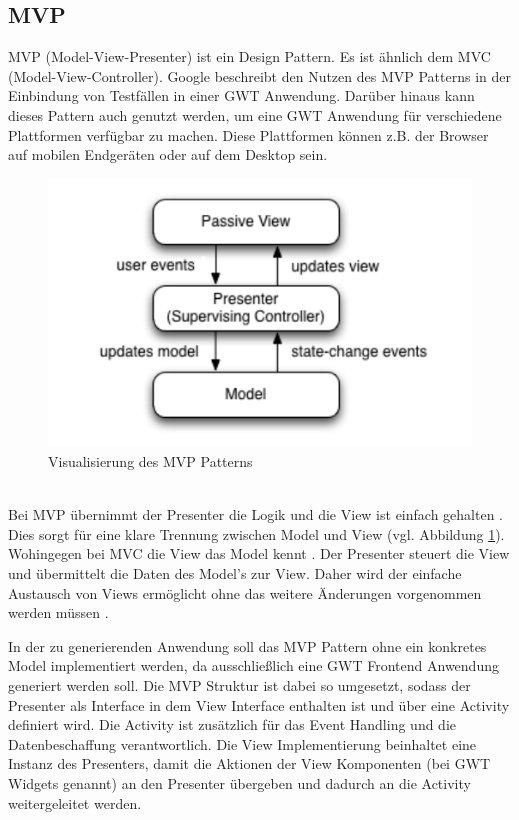 \subsection{MVP}
\label{MVP}
MVP (Model-View-Presenter) ist ein Design Pattern. Es ist ähnlich dem MVC
(Model-View-Controller). Google beschreibt den Nutzen des MVP Patterns in der
Einbindung von Testfällen in einer GWT Anwendung. Darüber hinaus kann dieses
Pattern auch genutzt werden, um eine GWT Anwendung für verschiedene Plattformen
verfügbar zu machen. Diese Plattformen können z.B. der Browser auf mobilen
Endgeräten oder auf dem Desktop sein.
\begin{figure}[htbp]
\begin{center}
\includegraphics{./img/MVP.pdf}
\caption{Visualisierung des MVP Patterns \cite{bib:MVP1}}\label{Fig:MVP}
\end{center}
\end{figure}\\
Bei MVP übernimmt der Presenter die Logik und die View ist einfach gehalten
\cite{bib:MVP2}. Dies sorgt für eine klare Trennung zwischen Model und View (vgl.
Abbildung \ref{Fig:MVP}). Wohingegen bei MVC die View das Model kennt
\cite{bib:MVCvsMVP}. Der Presenter steuert die View und übermittelt die Daten
des Model's zur View.
Daher wird der einfache Austausch von Views ermöglicht ohne das weitere
Änderungen vorgenommen werden müssen \cite{bib:MVP1}\cite{bib:MVP2}.

In der zu generierenden Anwendung soll das MVP Pattern ohne ein konkretes Model
implementiert werden, da ausschließlich eine GWT Frontend Anwendung generiert
werden soll. Die MVP Struktur ist dabei so umgesetzt, sodass der Presenter als
Interface in dem View Interface enthalten ist und über eine Activity definiert
wird. Die Activity ist zusätzlich für das Event Handling und die
Datenbeschaffung verantwortlich. Die View Implementierung beinhaltet eine
Instanz des Presenters, damit die Aktionen der View Komponenten
(bei GWT Widgets genannt) an den Presenter übergeben und dadurch an die
Activity weitergeleitet werden.
